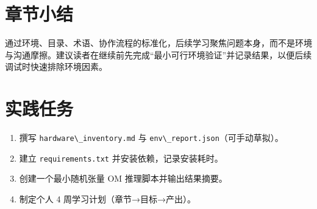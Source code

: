 \section{章节小结}\label{ux7ae0ux8282ux5c0fux7ed3}

通过环境、目录、术语、协作流程的标准化，后续学习聚焦问题本身，而不是环境与沟通摩擦。建议读者在继续前先完成``最小可行环境验证''并记录结果，以便后续调试时快速排除环境因素。

\section{实践任务}\label{ux5b9eux8df5ux4efbux52a1}

\begin{enumerate}
\def\labelenumi{\arabic{enumi}.}
\tightlist
\item
  撰写 \passthrough{\lstinline!hardware\_inventory.md!} 与
  \passthrough{\lstinline!env\_report.json!}（可手动草拟）。
\item
  建立 \passthrough{\lstinline!requirements.txt!}
  并安装依赖，记录安装耗时。
\item
  创建一个最小随机张量 OM 推理脚本并输出结果摘要。
\item
  制定个人 4 周学习计划（章节→目标→产出）。
\end{enumerate}
